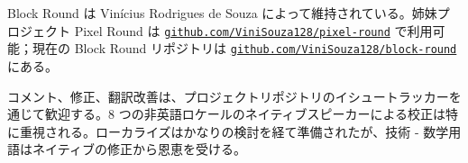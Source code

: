 \documentclass[12pt,a4paper]{scrartcl}
\newcommand{\biblink}[2]{\href{#1}{\nolinkurl{#2}}}
\begin{document}
\vspace{0.6em}

Block Round は Vinícius Rodrigues de Souza によって維持されている。姉妹プロジェクト Pixel Round は \biblink{https://github.com/ViniSouza128/pixel-round}{github.com/ViniSouza128/pixel-round} で利用可能；現在の Block Round リポジトリは \biblink{https://github.com/ViniSouza128/block-round}{github.com/ViniSouza128/block-round} にある。

コメント、修正、翻訳改善は、プロジェクトリポジトリのイシュートラッカーを通じて歓迎する。8 つの非英語ロケールのネイティブスピーカーによる校正は特に重視される。ローカライズはかなりの検討を経て準備されたが、技術 - 数学用語はネイティブの修正から恩恵を受ける。
\end{document}
